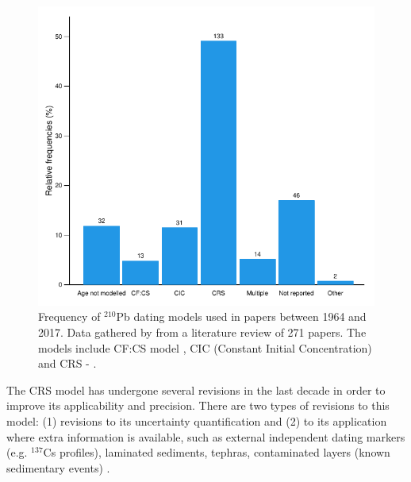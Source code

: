 \documentclass [10pt] {article}
\begin{document}
\begin{figure}[h!]
	\begin{centering}
		\includegraphics[width=.75\linewidth]{barras.pdf}
		\caption{Frequency of $^{210}$Pb dating models used in papers between 1964 and 2017. Data gathered by \citet{Courtney2019} from a literature review of 271 papers. The models include CF:CS model \citep[The Constant Flux - Constant Sedimentation;][]{Robbins1978}, CIC (Constant Initial Concentration) \citep{Goldberg1963,Crozaz1964,Robbins1978} and CRS -  \citep[Constant Rate of Supply;][]{Appleby1978,Robbins1978}. }
		\label{fig:210models}
	\end{centering}
\end{figure}

The CRS model has undergone several revisions in the last decade in order to improve its applicability and precision. 
There are two types of revisions to this model: (1) revisions to its uncertainty quantification \citep[eg. ][]{Binford1990,Appleby2001,Sanchez-Cabeza2014} and (2) to its application where extra information is available, such as external independent dating markers (e.g. $^{137}$Cs profiles), laminated sediments, tephras, contaminated layers (known sedimentary events) \citep[eg.][]{Appleby1998,Appleby2001,Appleby2008}. 
\end{document}
